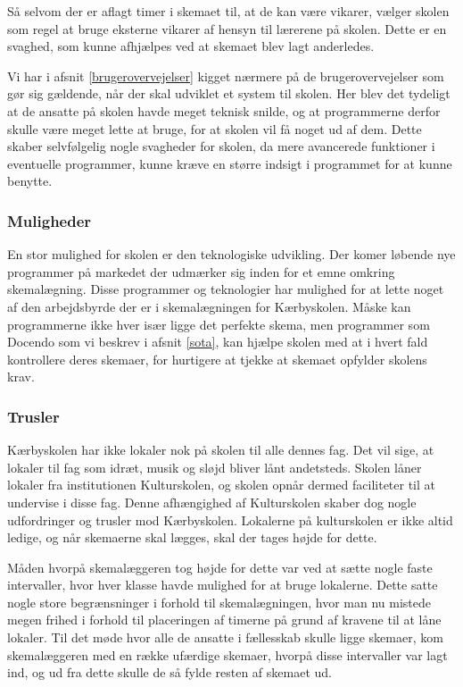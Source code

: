 Så selvom der er aflagt timer i skemaet til, at de kan være vikarer, vælger skolen som regel at bruge eksterne vikarer af hensyn til lærerene på skolen. Dette er en svaghed, som kunne afhjælpes ved at skemaet blev lagt anderledes.

Vi har i afsnit \ref{brugerovervejelser} kigget nærmere på de brugerovervejelser som gør sig gældende, når der skal udviklet et system til skolen. Her blev det tydeligt at de ansatte på skolen havde meget teknisk snilde, og at programmerne derfor skulle være meget lette at bruge, for at skolen vil få noget ud af dem. Dette skaber selvfølgelig nogle svagheder for skolen, da mere avancerede funktioner i eventuelle programmer, kunne kræve en større indsigt i programmet for at kunne benytte.

\subsubsection*{Muligheder}
En stor mulighed for skolen er den teknologiske udvikling. Der komer løbende nye programmer på markedet der udmærker sig inden for et emne omkring skemalægning. Disse programmer og teknologier har mulighed for at lette noget af den arbejdsbyrde der er i skemalægningen for Kærbyskolen. Måske kan programmerne ikke hver især ligge det perfekte skema, men programmer som Docendo som vi beskrev i afsnit \ref{sota}, kan hjælpe skolen med at i hvert fald kontrollere deres skemaer, for hurtigere at tjekke at skemaet opfylder skolens krav.

\subsubsection*{Trusler}
Kærbyskolen har ikke lokaler nok på skolen til alle dennes fag. Det vil sige, at lokaler til fag som idræt, musik og sløjd bliver lånt andetsteds. Skolen låner lokaler fra institutionen Kulturskolen, og skolen opnår dermed faciliteter til at undervise i disse fag. Denne afhængighed af Kulturskolen skaber dog nogle udfordringer og trusler mod Kærbyskolen. Lokalerne på kulturskolen er ikke altid ledige, og når skemaerne skal lægges, skal der tages højde for dette. 

Måden hvorpå skemalæggeren tog højde for dette var ved at sætte nogle faste intervaller, hvor hver klasse havde mulighed for at bruge lokalerne. Dette satte nogle store begrænsninger i forhold til skemalægningen, hvor man nu mistede megen frihed i forhold til placeringen af timerne på grund af kravene til at låne lokaler. Til det møde hvor alle de ansatte i fællesskab skulle ligge skemaer, kom skemalæggeren med en række ufærdige skemaer, hvorpå disse intervaller var lagt ind, og ud fra dette skulle de så fylde resten af skemaet ud.  

